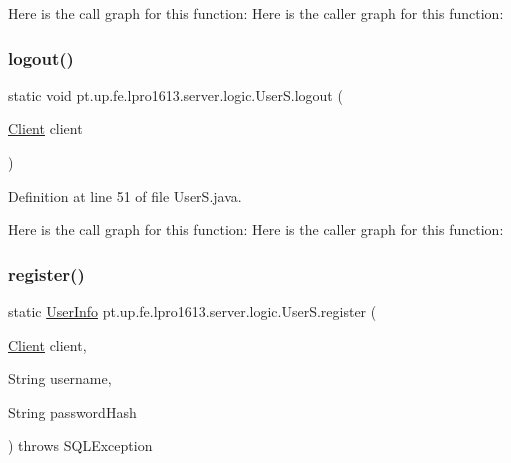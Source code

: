 Here is the call graph for this function\+:
Here is the caller graph for this function\+:
\hypertarget{classpt_1_1up_1_1fe_1_1lpro1613_1_1server_1_1logic_1_1_user_s_ade6f87a4adfd727f4fceca4f9ac17362}{}\label{classpt_1_1up_1_1fe_1_1lpro1613_1_1server_1_1logic_1_1_user_s_ade6f87a4adfd727f4fceca4f9ac17362} 
\subsubsection{\texorpdfstring{logout()}{logout()}}
{\footnotesize\ttfamily static void pt.\+up.\+fe.\+lpro1613.\+server.\+logic.\+User\+S.\+logout (\begin{DoxyParamCaption}\item[{\hyperlink{classpt_1_1up_1_1fe_1_1lpro1613_1_1server_1_1conn_1_1_client}{Client}}]{client }\end{DoxyParamCaption})\hspace{0.3cm}{\ttfamily [static]}}



Definition at line 51 of file User\+S.\+java.

Here is the call graph for this function\+:
Here is the caller graph for this function\+:
\hypertarget{classpt_1_1up_1_1fe_1_1lpro1613_1_1server_1_1logic_1_1_user_s_ae46d3839ba68eb377aff71f23e3b3936}{}\label{classpt_1_1up_1_1fe_1_1lpro1613_1_1server_1_1logic_1_1_user_s_ae46d3839ba68eb377aff71f23e3b3936} 
\subsubsection{\texorpdfstring{register()}{register()}}
{\footnotesize\ttfamily static \hyperlink{classpt_1_1up_1_1fe_1_1lpro1613_1_1sharedlib_1_1tuples_1_1_user_info}{User\+Info} pt.\+up.\+fe.\+lpro1613.\+server.\+logic.\+User\+S.\+register (\begin{DoxyParamCaption}\item[{\hyperlink{classpt_1_1up_1_1fe_1_1lpro1613_1_1server_1_1conn_1_1_client}{Client}}]{client,  }\item[{String}]{username,  }\item[{String}]{password\+Hash }\end{DoxyParamCaption}) throws S\+Q\+L\+Exception\hspace{0.3cm}{\ttfamily [static]}}



